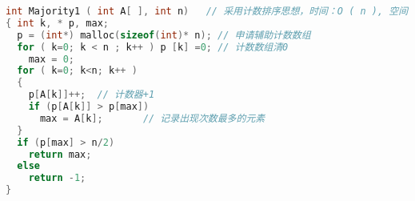 \begin{lstlisting}[language=cpp]
int Majority1 ( int A[ ], int n)   // 采用计数排序思想，时间：O ( n ), 空间：O ( n ) 
{ int k, * p, max;
  p = (int*) malloc(sizeof(int)* n); // 申请辅助计数数组
  for ( k=0; k < n ; k++ ) p [k] =0; // 计数数组清0
    max = 0;
  for ( k=0; k<n; k++ ) 
  { 
    p[A[k]]++;  // 计数器+1
    if (p[A[k]] > p[max])
      max = A[k];       // 记录出现次数最多的元素 
  } 
  if (p[max] > n/2)
    return max;
  else
    return -1;
} 
\end{lstlisting}